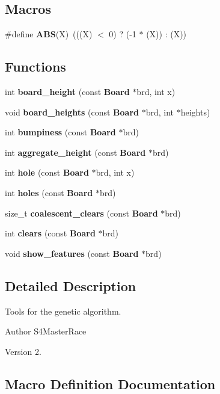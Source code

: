 \subsection*{Macros}
\begin{DoxyCompactItemize}
\item 
\#define \textbf{ A\+BS}(X)~(((X) $<$ 0) ? (-\/1 $\ast$ (X)) \+: (X))
\end{DoxyCompactItemize}
\subsection*{Functions}
\begin{DoxyCompactItemize}
\item 
int \textbf{ board\+\_\+height} (const \textbf{ Board} $\ast$brd, int x)
\item 
void \textbf{ board\+\_\+heights} (const \textbf{ Board} $\ast$brd, int $\ast$heights)
\item 
int \textbf{ bumpiness} (const \textbf{ Board} $\ast$brd)
\item 
int \textbf{ aggregate\+\_\+height} (const \textbf{ Board} $\ast$brd)
\item 
int \textbf{ hole} (const \textbf{ Board} $\ast$brd, int x)
\item 
int \textbf{ holes} (const \textbf{ Board} $\ast$brd)
\item 
size\+\_\+t \textbf{ coalescent\+\_\+clears} (const \textbf{ Board} $\ast$brd)
\item 
int \textbf{ clears} (const \textbf{ Board} $\ast$brd)
\item 
void \textbf{ show\+\_\+features} (const \textbf{ Board} $\ast$brd)
\end{DoxyCompactItemize}


\subsection{Detailed Description}
Tools for the genetic algorithm. 

\begin{DoxyAuthor}{Author}
S4\+Master\+Race 
\end{DoxyAuthor}
\begin{DoxyVersion}{Version}
2. 
\end{DoxyVersion}


\subsection{Macro Definition Documentation}
\mbox{\label{tools_8h_adefab4344518e9d35a80d87c20c0fa48}} 
